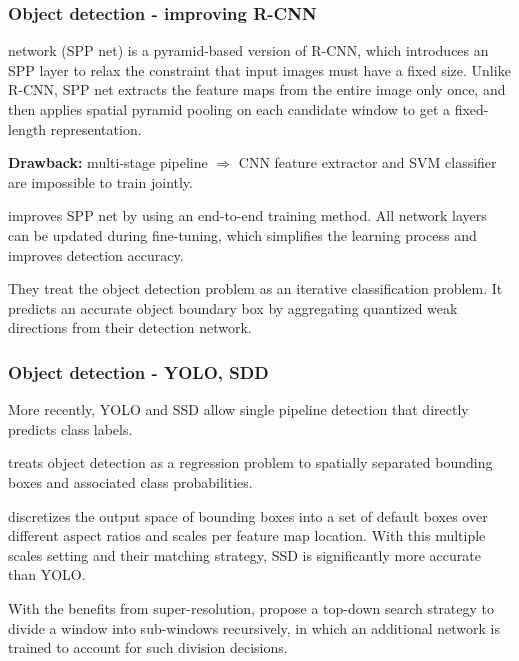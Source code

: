 \begin{frame}[allowframebreaks]
\end{frame}


\begin{frame}
	\frametitle{Object detection - improving R-CNN}
	
	
	 network (SPP net) is a pyramid-based version of R-CNN, which introduces an SPP layer to relax the constraint that input images must have a fixed size. Unlike R-CNN, SPP net extracts the feature maps from the entire image only once, and then applies spatial pyramid pooling on each candidate window to get a fixed-length representation. 
	
\textbf{Drawback:} multi-stage pipeline $\Rightarrow$ CNN feature extractor and SVM classifier are impossible to train jointly.
	
	\medskip 
	
	
	 improves SPP net by using an end-to-end training method. All network layers can be updated during fine-tuning, which simplifies the learning process and improves detection accuracy. 
	
	\medskip
	
	
	They treat the object detection problem as an iterative classification problem. It predicts an accurate object boundary box by aggregating quantized weak directions from their detection network.
	
\end{frame}


\begin{frame}
	\frametitle{Object detection - YOLO, SDD}
	
	
	More recently, YOLO \cite{redmon2016you} and SSD \cite{liu2016ssd} allow single pipeline detection that directly predicts class labels. 
	
	\medskip
	
	 treats object detection as a regression problem to spatially separated bounding boxes and associated class probabilities.  
	
	\medskip
	
	 discretizes the output space of bounding boxes into a set of default boxes over different aspect ratios and scales per feature map location. With this multiple scales setting and their matching strategy, SSD is significantly more accurate than YOLO. 
	
	\medskip
	
	\bigskip 
	
	With the benefits from super-resolution, \cite{lu2016adaptive} propose a top-down search strategy to divide a window into sub-windows recursively, in which an additional network is trained to account for such division decisions.
	
\end{frame}

